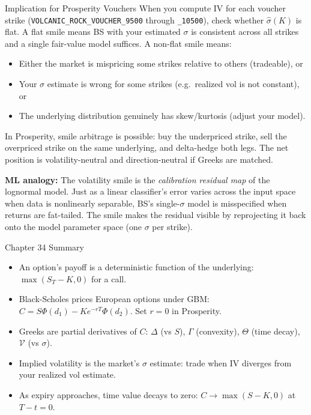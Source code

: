 \documentclass[12pt,a4paper,openany]{report}
\theoremstyle{definition}
\begin{document}
\begin{warningbox}{Implication for Prosperity Vouchers}
When you compute IV for each voucher strike (\texttt{VOLCANIC\_ROCK\_VOUCHER\_9500} through \texttt{\_10500}), check whether $\hat{\sigma}(K)$ is flat. A flat smile means BS with your estimated $\sigma$ is consistent across all strikes and a single fair-value model suffices. A non-flat smile means:
\begin{itemize}
  \item Either the market is mispricing some strikes relative to others (tradeable), or
  \item Your $\sigma$ estimate is wrong for some strikes (e.g.\ realized vol is not constant), or
  \item The underlying distribution genuinely has skew/kurtosis (adjust your model).
\end{itemize}
In Prosperity, smile arbitrage is possible: buy the underpriced strike, sell the overpriced strike on the same underlying, and delta-hedge both legs. The net position is volatility-neutral and direction-neutral if Greeks are matched.
\end{warningbox}

\textbf{ML analogy:} The volatility smile is the \emph{calibration residual map} of the lognormal model. Just as a linear classifier's error varies across the input space when data is nonlinearly separable, BS's single-$\sigma$ model is misspecified when returns are fat-tailed. The smile makes the residual visible by reprojecting it back onto the model parameter space (one $\sigma$ per strike).

\begin{takeawaybox}{Chapter 34 Summary}
\begin{itemize}
  \item An option's payoff is a deterministic function of the underlying: $\max(S_T - K, 0)$ for a call.
  \item Black-Scholes prices European options under GBM: $C = S\Phi(d_1) - Ke^{-rT}\Phi(d_2)$. Set $r = 0$ in Prosperity.
  \item Greeks are partial derivatives of $C$: $\Delta$ (vs $S$), $\Gamma$ (convexity), $\Theta$ (time decay), $\mathcal{V}$ (vs $\sigma$).
  \item Implied volatility is the market's $\sigma$ estimate: trade when IV diverges from your realized vol estimate.
  \item As expiry approaches, time value decays to zero: $C \to \max(S-K, 0)$ at $T-t = 0$.
\end{itemize}
\end{takeawaybox}
\end{document}
